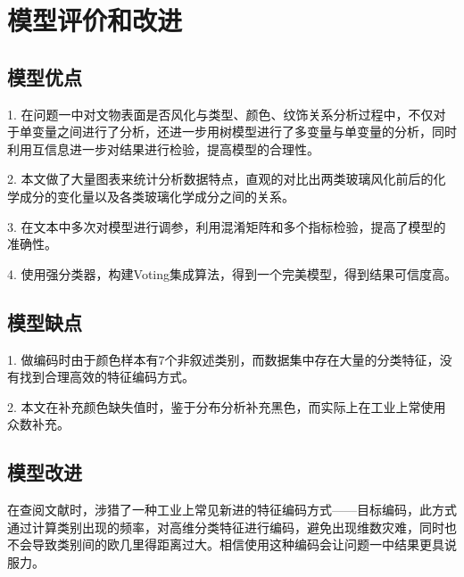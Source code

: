 \section{模型评价和改进}

\subsection{模型优点}

1. 在问题一中对文物表面是否风化与类型、颜色、纹饰关系分析过程中，不仅对于单变量之间进行了分析，还进一步用树模型进行了多变量与单变量的分析，同时利用互信息进一步对结果进行检验，提高模型的合理性。

2. 本文做了大量图表来统计分析数据特点，直观的对比出两类玻璃风化前后的化学成分的变化量以及各类玻璃化学成分之间的关系。

3. 在文本中多次对模型进行调参，利用混淆矩阵和多个指标检验，提高了模型的准确性。

4. 使用强分类器，构建Voting集成算法，得到一个完美模型，得到结果可信度高。

\subsection{模型缺点}

1. 做编码时由于颜色样本有7个非叙述类别，而数据集中存在大量的分类特征，没有找到合理高效的特征编码方式。

2. 本文在补充颜色缺失值时，鉴于分布分析补充黑色，而实际上在工业上常使用众数补充。

\subsection{模型改进}

在查阅文献时，涉猎了一种工业上常见新进的特征编码方式——目标编码，此方式通过计算类别出现的频率，对高维分类特征进行编码，避免出现维数灾难，同时也不会导致类别间的欧几里得距离过大。相信使用这种编码会让问题一中结果更具说服力。